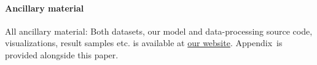 \documentclass{article}
\newcommand{\website}{https://untrix.github.io/i2l/}
\newcommand{\Suppmat}{Appendix}
\begin{document}
\paragraph{Ancillary material}
All ancillary material: Both datasets, our model and data-processing source code, visualizations, result samples etc. is available at \href{\website}{our website}. \Suppmat ~is provided alongside this paper.

\nocite{Xu2015ShowAA}
\nocite{Deng2017ImagetoMarkupGW}
\nocite{Bluche2014ACO}

%



\appendix

\end{document}
